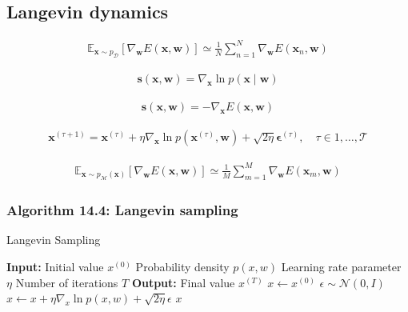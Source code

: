 \documentclass{article}
\begin{document}
\subsection{Langevin dynamics}

\begin{align*}
\mathbb{E}_{\mathbf{x} \sim p_{\mathcal{D}}}\left[
\nabla_{\mathbf{w}} E(\mathbf{x}, \mathbf{w})\right]
\simeq \frac{1}{N} \sum_{n=1}^{N} \nabla_{\mathbf{w}} E\left(\mathbf{x}_{n}, \mathbf{w}\right) \tag{14.58}
\end{align*}

\begin{align*}
\mathbf{s}(\mathbf{x}, \mathbf{w})=\nabla_{\mathbf{x}} \ln p(\mathbf{x} \mid \mathbf{w}) \tag{14.59}
\end{align*}

\begin{align*}
\mathbf{s}(\mathbf{x}, \mathbf{w})=-\nabla_{\mathbf{x}} E(\mathbf{x}, \mathbf{w}) \tag{14.60}
\end{align*}

\begin{align*}
\mathbf{x}^{(\tau+1)}=\mathbf{x}^{(\tau)}+\eta \nabla_{\mathbf{x}} \ln p\left(\mathbf{x}^{(\tau)}, \mathbf{w}\right)+\sqrt{2 \eta} \boldsymbol{\epsilon}^{(\tau)}, \quad \tau \in 1, \ldots, \mathcal{T} \tag{14.61}
\end{align*}

\begin{align*}
\mathbb{E}_{\mathbf{x} \sim p_{\mathcal{M}}(\mathbf{x})}\left[
\nabla_{\mathbf{w}} E(\mathbf{x}, \mathbf{w})\right]
\simeq \frac{1}{M} \sum_{m=1}^{M} \nabla_{\mathbf{w}} E\left(\mathbf{x}_{m}, \mathbf{w}\right) \tag{14.62}
\end{align*}

\subsubsection{Algorithm 14.4: Langevin sampling}

\begin{algorithm}[H]
\caption{Langevin Sampling}
\begin{algorithmic}[1]
\STATE \textbf{Input:} Initial value $x^{(0)}$
\STATE \quad Probability density $p(x, w)$
\STATE \quad Learning rate parameter $\eta$
\STATE \quad Number of iterations $T$
\STATE \textbf{Output:} Final value $x^{(T)}$
\STATE $x \gets x^{(0)}$
    \STATE $\epsilon \sim \mathcal{N}(0, I)$
    \STATE $x \gets x + \eta \nabla_x \ln p(x, w) + \sqrt{2\eta} \epsilon$
\ENDFOR
\RETURN $x$ 
\end{algorithmic}
\end{algorithm}
\end{document}
